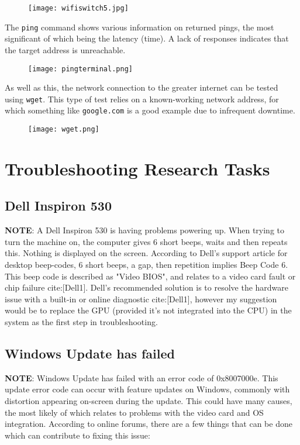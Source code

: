 \documentclass[11pt]{amsart}
\newcommand{\admonition}[2]{\textbf{#1}: {#2}}
\begin{document}
\begin{figure}[h]{}
\centering\texttt{[image: wifiswitch5.jpg]}
\caption{}

\end{figure}

The \texttt{ping} command shows various information on returned pings, the most significant of which being the latency (time). A lack of responses indicates that the target address is unreachable.


\begin{figure}[h]{}
\centering\texttt{[image: pingterminal.png]}
\caption{}

\end{figure}

As well as this, the network connection to the greater internet can be tested using \texttt{wget}. This type of test relies on a known-working network address, for which something like \texttt{google.com} is a good example due to infrequent downtime.


\begin{figure}[h]{}
\centering\texttt{[image: wget.png]}
\caption{}

\end{figure}

\hypertarget{x-troubleshooting-research-tasks}{\section*{Troubleshooting Research Tasks}}
\hypertarget{x-dell-inspiron-530}{\subsection*{Dell Inspiron 530}}
\admonition{NOTE}{A Dell Inspiron 530 is having problems powering up. When trying to turn the machine on, the computer gives 6 short beeps, waits and then repeats this. Nothing is displayed on the screen.}
According to Dell’s support article for desktop beep-codes, 6 short beeps, a gap, then repetition implies Beep Code 6. This beep code is described as "Video BIOS", and relates to a video card fault or chip failure cite:[Dell1]. Dell’s recommended solution is to resolve the hardware issue with a built-in or online diagnostic cite:[Dell1], however my suggestion would be to replace the GPU (provided it’s not integrated into the CPU) in the system as the first step in troubleshooting.


\hypertarget{x-windows-update-has-failed}{\subsection*{Windows Update has failed}}
\admonition{NOTE}{Windows Update has failed with an error code of 0x8007000e.}
This update error code can occur with feature updates on Windows, commonly with distortion appearing on-screen during the update. This could have many causes, the most likely of which relates to problems with the video card and OS integration. According to online forums, there are a few things that can be done which can contribute to fixing this issue:
\end{document}
